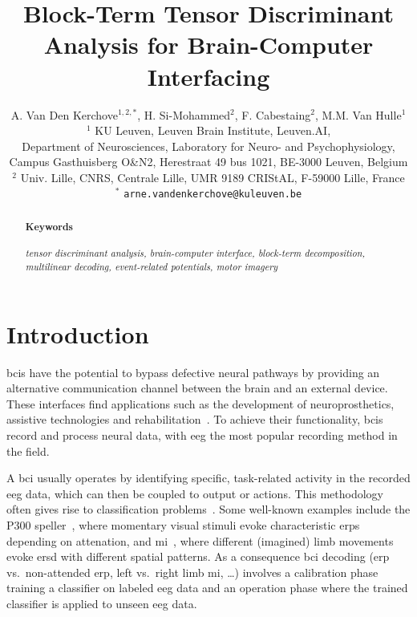 \documentclass[twocolumn]{article}
\title{Block-Term Tensor Discriminant Analysis for Brain-Computer Interfacing}
\author{%
	A. Van Den Kerchove$^{1,2,*}$,
	H. Si-Mohammed$^{2}$,
	F. Cabestaing$^{2}$,
	M.M. Van Hulle$^{1}$
	\bigskip\\
	$^1$ KU Leuven,
	Leuven Brain Institute,
	Leuven.AI,\\
	Department of Neurosciences,
	Laboratory for Neuro- and Psychophysiology,
	\\
	Campus Gasthuisberg O\&N2,
	Herestraat 49 bus 1021,
	BE-3000 Leuven,
	Belgium
	\smallskip\\
	$^2$ Univ. Lille, CNRS, Centrale Lille,
	UMR 9189 CRIStAL,
	F-59000 Lille,
	France
	\smallskip\\
	$^*$ \texttt{arne.vandenkerchove@kuleuven.be}
}
\begin{document}
\maketitle

\begin{abstract}
	

	\paragraph{Keywords}
	\emph{%
		tensor discriminant analysis,
		brain-computer interface,
		block-term decomposition,
		multilinear decoding,
		event-related potentials,
		motor imagery
	}
\end{abstract}

\section{Introduction}

\Acp{bci} have the potential to bypass
defective neural pathways by providing an alternative communication channel
between the brain and an external device.
These interfaces find applications such as the development of
neuroprosthetics, assistive technologies and rehabilitation~\cite{Wolpaw2020}.
To achieve their functionality, \acp{bci} record and process neural data,  with
\ac{eeg} the most popular recording method in the field.

A \ac{bci} usually operates by identifying specific, task-related activity in
the recorded \ac{eeg} data, which can then be coupled to output or actions.
This methodology often gives rise to classification problems~\cite{Lotte2018}.
Some well-known examples include the P300 speller~\cite{Krusienski2006}, where
momentary visual stimuli evoke characteristic \acp{erp} depending on attenation,
and \ac{mi}~\cite{Aggarwal2019}, where different (imagined) limb movements evoke
\ac{ersd} with different spatial patterns.
As a consequence \ac{bci} decoding (\ac{erp} vs.\ non-attended \ac{erp}, left
vs.\ right limb \ac{mi}, \ldots) involves a calibration phase training a classifier
on labeled \ac{eeg} data and an operation phase where the trained classifier is applied
to unseen \ac{eeg} data.
\end{document}
